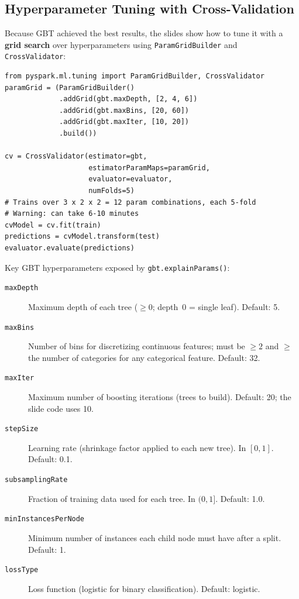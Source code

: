 \documentclass[11pt]{article}
\begin{document}
\subsection{Hyperparameter Tuning with Cross-Validation}
Because GBT achieved the best results, the slides show how to tune it with a \textbf{grid search} over hyperparameters using \texttt{ParamGridBuilder} and \texttt{CrossValidator}:

\begin{verbatim}
from pyspark.ml.tuning import ParamGridBuilder, CrossValidator
paramGrid = (ParamGridBuilder()
             .addGrid(gbt.maxDepth, [2, 4, 6])
             .addGrid(gbt.maxBins, [20, 60])
             .addGrid(gbt.maxIter, [10, 20])
             .build())

cv = CrossValidator(estimator=gbt,
                    estimatorParamMaps=paramGrid,
                    evaluator=evaluator,
                    numFolds=5)
# Trains over 3 x 2 x 2 = 12 param combinations, each 5-fold
# Warning: can take 6-10 minutes
cvModel = cv.fit(train)
predictions = cvModel.transform(test)
evaluator.evaluate(predictions)
\end{verbatim}

Key GBT hyperparameters exposed by \texttt{gbt.explainParams()}:
\begin{description}
    \item[\texttt{maxDepth}] Maximum depth of each tree ($\geq 0$; depth~0 = single leaf). Default: 5.
    \item[\texttt{maxBins}] Number of bins for discretizing continuous features; must be $\geq 2$ and $\geq$ the number of categories for any categorical feature. Default: 32.
    \item[\texttt{maxIter}] Maximum number of boosting iterations (trees to build). Default: 20; the slide code uses 10.
    \item[\texttt{stepSize}] Learning rate (shrinkage factor applied to each new tree). In $[0,1]$. Default: 0.1.
    \item[\texttt{subsamplingRate}] Fraction of training data used for each tree. In $(0,1]$. Default: 1.0.
    \item[\texttt{minInstancesPerNode}] Minimum number of instances each child node must have after a split. Default: 1.
    \item[\texttt{lossType}] Loss function (logistic for binary classification). Default: logistic.
\end{description}
\end{document}
